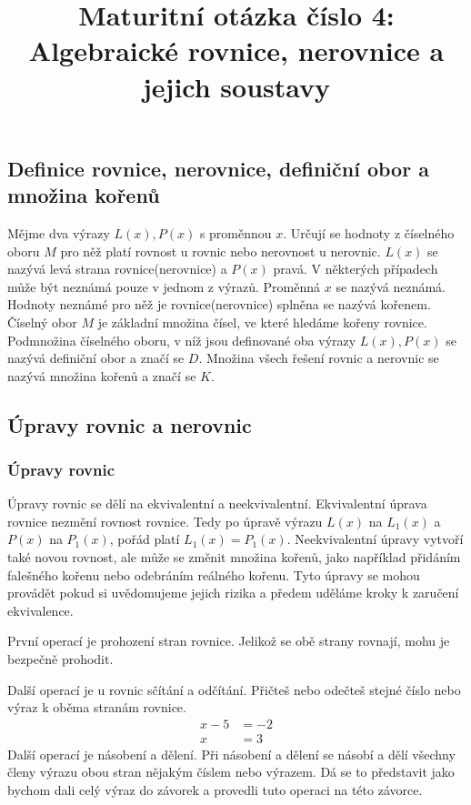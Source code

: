 \documentclass[12pt]{article}
\title{Maturitní otázka číslo 4: Algebraické rovnice, nerovnice a jejich soustavy}
\author{}
\date{}
\begin{document}
\maketitle

\subsection*{Definice rovnice, nerovnice, definiční obor a množina kořenů}
Mějme dva výrazy $L(x), P(x)$ s proměnnou $x$. Určují se hodnoty z číselného oboru $M$ pro něž platí
rovnost u rovnic nebo nerovnost u nerovnic. $L(x)$ se nazývá levá strana rovnice(nerovnice) a $P(x)$
pravá. V některých případech může být neznámá pouze v jednom z výrazů. Proměnná $x$ se nazývá neznámá.
Hodnoty neznámé pro něž je rovnice(nerovnice) splněna se nazývá kořenem. Číselný obor $M$ je základní
množina čísel, ve které hledáme kořeny rovnice. Podmnožina číselného oboru, v níž jsou definované
oba výrazy $L(x), P(x)$ se nazývá definiční obor a značí se $D$. Množina všech řešení rovnic a
nerovnic se nazývá množina kořenů a značí se $K$.
\subsection*{Úpravy rovnic a nerovnic}
\subsubsection*{Úpravy rovnic}
Úpravy rovnic se dělí na ekvivalentní a neekvivalentní. Ekvivalentní úprava rovnice nezmění rovnost
rovnice. Tedy po úpravě výrazu $L(x)$ na $L_1(x)$ a $P(x)$ na $P_1(x)$, pořád platí $L_1(x) = P_1(x)$.
Neekvivalentní úpravy vytvoří také novou rovnost, ale může se změnit množina kořenů, jako například
přidáním falešného kořenu nebo odebráním reálného kořenu. Tyto úpravy se mohou provádět pokud si
uvědomujeme jejich rizika a předem uděláme kroky k zaručení ekvivalence.

První operací je prohození stran rovnice. Jelikož se obě strany rovnají, mohu je bezpečně prohodit.

Další operací je u rovnic sčítání a odčítání. Přičteš nebo odečteš stejné číslo nebo výraz
k oběma stranám rovnice.
\[
\begin{aligned}
    x - 5 &= -2 \\
    x &= 3
\end{aligned}
\]
Další operací je násobení a dělení. Při násobení a dělení se násobí a dělí všechny členy
výrazu obou stran nějakým číslem nebo výrazem. Dá se to představit jako bychom dali celý výraz do
závorek a provedli tuto operaci na této závorce.
\end{document}
